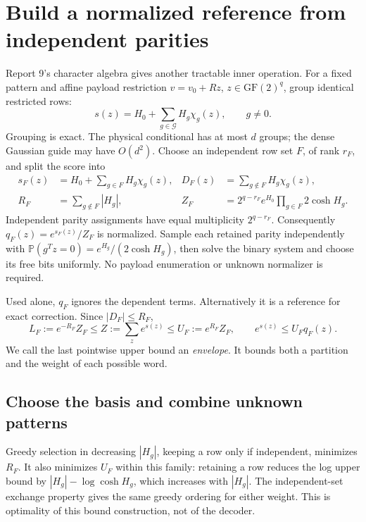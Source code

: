\documentclass[10pt,a4paper]{article}
\newcommand{\Prb}{\mathbb P}
\newcommand{\GF}{\mathrm{GF}}
\begin{document}
\section{Build a normalized reference from independent parities}
\label{sec:envelope}
Report 9's character algebra gives another tractable inner operation. For a fixed pattern and affine
payload restriction $v=v_0+Rz$, $z\in\GF(2)^q$, group identical restricted rows:
\begin{equation}
 s(z)=H_0+\sum_{g\in\mathcal G}H_g\chi_g(z),\qquad g\ne0.
 \label{eq:characters}
\end{equation}
Grouping is exact. The physical conditional has at most $d$ groups; the dense Gaussian guide may have
$O(d^2)$. Choose an independent row set $F$, of rank $r_F$, and split the score into
\begin{align}
 s_F(z)&=H_0+\sum_{g\in F}H_g\chi_g(z),&
 D_F(z)&=\sum_{g\notin F}H_g\chi_g(z),\nonumber\\
 R_F&=\sum_{g\notin F}|H_g|,&
 Z_F&=2^{q-r_F}e^{H_0}\prod_{g\in F}2\cosh H_g.
 \label{eq:basis}
\end{align}
Independent parity assignments have equal multiplicity $2^{q-r_F}$. Consequently
$q_F(z)=e^{s_F(z)}/Z_F$ is normalized. Sample each retained parity independently with
$\Prb(g^Tz=0)=e^{H_g}/(2\cosh H_g)$, then solve the binary system and choose its free bits uniformly.
No payload enumeration or unknown normalizer is required.

Used alone, $q_F$ ignores the dependent terms. Alternatively it is a reference for exact correction.
Since $|D_F|\leq R_F$,
\begin{equation}
 L_F:=e^{-R_F}Z_F\leq Z:=\sum_z e^{s(z)}\leq U_F:=e^{R_F}Z_F,
 \qquad e^{s(z)}\leq U_Fq_F(z).
 \label{eq:partition}
\end{equation}
We call the last pointwise upper bound an \emph{envelope}. It bounds both a partition and the weight
of each possible word.

\subsection{Choose the basis and combine unknown patterns}
Greedy selection in decreasing $|H_g|$, keeping a row only if independent, minimizes $R_F$.
It also minimizes $U_F$ within this family: retaining a row reduces the log upper bound by
$|H_g|-\log\cosh H_g$, which increases with $|H_g|$. The independent-set exchange property gives
the same greedy ordering for either weight. This is optimality of this bound construction, not of the decoder.
\end{document}
